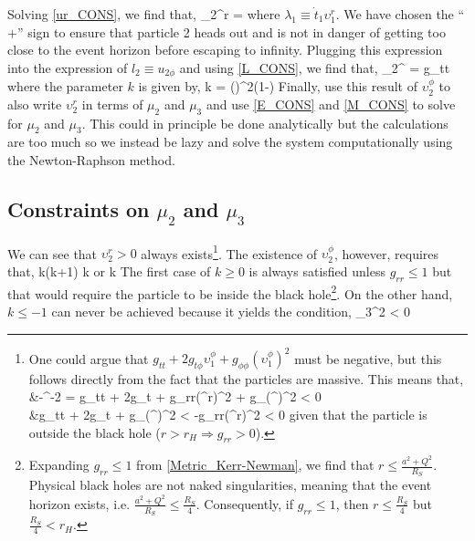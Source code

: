 Solving \eqref{ur_CONS}, we find that,
\be\label{v2r}
	\upsilon_{2}^{r} = 
\ee
where $\lambda_1 \equiv \dot{t}_1\upsilon_{1}^{r}$. We have chosen the ``$+$'' sign to ensure that particle 2 heads out and is not in danger of getting too close to the event horizon before escaping to infinity. Plugging this expression into the expression of $l_2 \equiv u_{2\phi}$ and using \eqref{L_CONS}, we find that,
\be
	\upsilon_{2}^{\phi} = g_{tt} 
\ee
where the parameter $k$ is given by,
\be
	k = \left(\right)^2\left(1-\right)
\ee
Finally, use this result of $\upsilon_{2}^{\phi}$ to also write $\upsilon_{2}^{r}$ in terms of $\mu_2$ and $\mu_3$ and use \eqref{E_CONS} and \eqref{M_CONS} to solve for $\mu_2$ and $\mu_3$. This could in principle be done analytically but the calculations are too much so we instead be lazy and solve the system computationally using the Newton-Raphson method.

\subsection{Constraints on $\mu_2$ and $\mu_3$}
We can see that $\upsilon_{2}^{r}>0$ always exists\footnote{One could argue that $g_{tt}+2g_{t\phi}\upsilon_1^{\phi}+g_{\phi\phi}(\upsilon_{1}^{\phi})^2$ must be negative, but this follows directly from the fact that the particles are massive. This means that,
	\be\ba
		&-^{-2} = g_{tt} + 2g_{t\phi} + g_{rr}(\upsilon^{r})^2 + g_{\phi\phi}(\upsilon^{\phi})^2 < 0 \\
		&\Rightarrow g_{tt} + 2g_{t\phi} + g_{\phi\phi}(\upsilon^{\phi})^2 < -g_{rr}(\upsilon^{r})^2 < 0
	\ea\ee
given that the particle is outside the black hole ($r>r_{H}\Rightarrow g_{rr}>0$).}. The existence of $\upsilon_{2}^{\phi}$, however, requires that,
\be
	k(k+1)  \Rightarrow k \;\; or \;\; k
\ee
The first case of $k\ge0$ is always satisfied unless $g_{rr}\le1$ but that would require the particle to be inside the black hole\footnote{Expanding $g_{rr}\le1$ from \eqref{Metric_Kerr-Newman}, we find that $r\le\frac{a^2+Q^2}{R_{S}}$. Physical black holes are not naked singularities, meaning that the event horizon exists, i.e. $\frac{a^2+Q^2}{R_{S}}\le\frac{R_{S}}{4}$. Consequently, if $g_{rr}\le1$, then $r\le\frac{R_{S}}{4}$ but $\frac{R_{S}}{4}<r_{H}$.}. On the other hand, $k\le-1$ can never be achieved because it yields the condition,
\be
	\mu_3^2 \le {}  < 0
\ee

